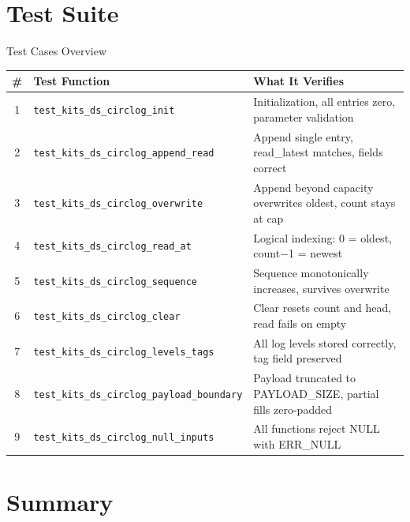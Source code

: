 \documentclass[aspectratio=169, 10pt]{beamer}
\begin{document}
\section{Test Suite}

\begin{frame}{Test Cases Overview}
\begin{table}
\centering
\small
\begin{tabular}{@{}clp{7cm}@{}}
\toprule
\textbf{\#} & \textbf{Test Function} & \textbf{What It Verifies} \\
\midrule
1 & \texttt{test\_kits\_ds\_circlog\_init}
  & Initialization, all entries zero, parameter validation \\
2 & \texttt{test\_kits\_ds\_circlog\_append\_read}
  & Append single entry, read\_latest matches, fields correct \\
3 & \texttt{test\_kits\_ds\_circlog\_overwrite}
  & Append beyond capacity overwrites oldest, count stays at cap \\
4 & \texttt{test\_kits\_ds\_circlog\_read\_at}
  & Logical indexing: 0 = oldest, count$-$1 = newest \\
5 & \texttt{test\_kits\_ds\_circlog\_sequence}
  & Sequence monotonically increases, survives overwrite \\
6 & \texttt{test\_kits\_ds\_circlog\_clear}
  & Clear resets count and head, read fails on empty \\
7 & \texttt{test\_kits\_ds\_circlog\_levels\_tags}
  & All log levels stored correctly, tag field preserved \\
8 & \texttt{test\_kits\_ds\_circlog\_payload\_boundary}
  & Payload truncated to PAYLOAD\_SIZE, partial fills zero-padded \\
9 & \texttt{test\_kits\_ds\_circlog\_null\_inputs}
  & All functions reject NULL with ERR\_NULL \\
\bottomrule
\end{tabular}
\end{table}
\end{frame}

\section{Summary}
\end{document}
